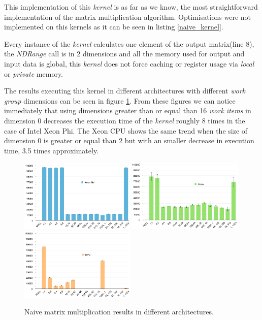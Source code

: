 \par{This implementation of this \emph{kernel} is as far as we know, the most 
    straightforward implementation of the matrix multiplication algorithm. 
    Optimisations were not implemented on this kernels as it can be seen in 
    listing \ref{naive_kernel}.} 
    
\par{Every instance of the \emph{kernel} calculates one element of the output 
    matrix(line 8), the \emph{NDRange} call is in 2 dimensions and all the 
    memory used for output and input data is global, this \emph{kernel}
    does not force caching or register usage via \emph{local} or \emph{private} 
    memory.}

\par{The results executing this kernel in different architectures with different 
    \emph{work group} dimensions can be seen in figure \ref{Naive}. From these 
    figures we can notice immediately that using dimensions greater than or 
    equal than 16 \emph{work items} in dimension 0 decreases the execution time 
    of the \emph{kernel} roughly 8 times in the case of Intel Xeon Phi. The
    Xeon CPU shows the same trend when the size of dimension 0 is greater or 
    equal than 2 but with an smaller decrease in execution time, 
    3.5 times approximately.}

\begin{figure}[!h]
    \centering
    \includegraphics[width=0.49\textwidth]{figures/naive_phi.png}
    \includegraphics[width=0.49\textwidth]{figures/naive_cpu.png}
    \includegraphics[width=0.49\textwidth]{figures/naive_gpu.png}
    \caption{Naive matrix multiplication results in different architectures.}
    \label{Naive}
\end{figure}

